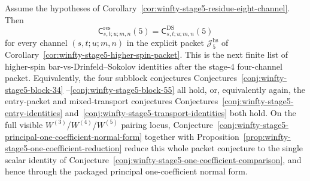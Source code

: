 \begin{conjecture}
\label{conj:winfty-stage5-higher-spin-identities}
\ClaimStatusConjectured{}
Assume the hypotheses of
Corollary~\ref{cor:winfty-stage5-residue-eight-channel}.  Then
\[
\mathsf{C}^{\mathrm{res}}_{s,t;u;m,n}(5)
=
\mathsf{C}^{\mathrm{DS}}_{s,t;u;m,n}(5)
\]
for every channel $(s,t;u;m,n)$ in the explicit packet
$\mathcal{J}_5^{\mathrm{hs}}$ of
Corollary~\ref{cor:winfty-stage5-higher-spin-packet}.  This is the
next finite list of higher-spin bar-vs-Drinfeld--Sokolov identities
after the stage-$4$ four-channel packet.  Equivalently, the four
subblock conjectures
Conjectures~\ref{conj:winfty-stage5-block-34}
--\ref{conj:winfty-stage5-block-55}
all hold, or, equivalently again, the entry-packet and mixed-transport
conjectures
Conjectures~\ref{conj:winfty-stage5-entry-identities}
and~\ref{conj:winfty-stage5-transport-identities}
both hold.  On the full visible
\texorpdfstring{$W^{(3)}$}{W3}/\texorpdfstring{$W^{(4)}$}{W4}/\texorpdfstring{$W^{(5)}$}{W5}
pairing locus,
Conjecture~\ref{conj:winfty-stage5-principal-one-coefficient-normal-form}
together with Proposition~\ref{prop:winfty-stage5-one-coefficient-reduction}
reduce this whole packet conjecture to the single scalar identity of
Conjecture~\ref{conj:winfty-stage5-one-coefficient-comparison},
and hence through the packaged principal one-coefficient normal form.
\end{conjecture}

